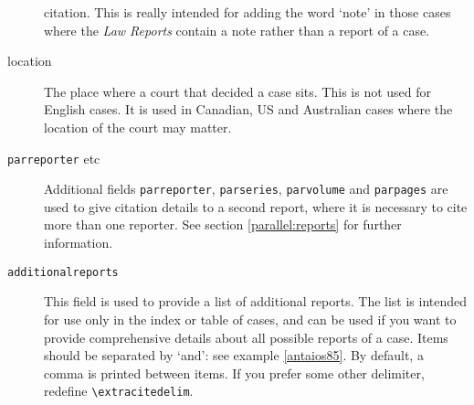 \documentclass[a5paper,fontsize=9pt,DIV=1]{scrartcl}
\begin{document}
\begin{description}
  citation. This is really intended for adding the word `note' in
  those cases where the \emph{Law Reports} contain a note rather than
  a report of a case.
\item[location]
The place where a court that decided a case sits. This
is not used for English cases. It is used in Canadian, US and
Australian cases where the location of the court may matter.
\item[\texttt{parreporter} etc]
Additional fields \texttt{parreporter},
\texttt{parseries}, \texttt{parvolume} and \texttt{parpages} are used
to give citation details to a second report, where it is necessary to
cite more than one reporter. See section \ref{parallel:reports} for
further information.
\item[\texttt{additionalreports}]
This field is used to provide a list
of additional reports. The list is intended for use only in the index
or table of cases, and can be used if you want to provide
comprehensive details about all possible reports of a case. Items should be separated by `and': see example \ref{antaios85}. By default, a comma is printed between items. If you prefer some other delimiter, redefine \verb|\extracitedelim|.
\end{description}
\end{document}
